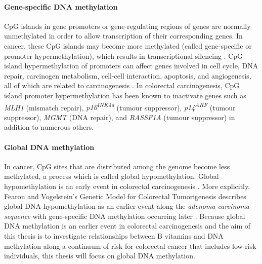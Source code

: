 \paragraph{Gene-specific DNA methylation} %
CpG islands in gene promoters or gene-regulating regions of genes are normally unmethylated in order to allow transcription of their corresponding genes. In cancer, these CpG islands may become more methylated (called gene-specific or promoter hypermethylation), which results in transcriptional silencing \cite{c185}. CpG island hypermethylation of promoters can affect genes involved in cell cycle, DNA repair, carcinogen metabolism, cell-cell interaction, apoptosis, and angiogenesis, all of which are related to carcinogenesis \cite{c182}. In colorectal carcinogenesis, CpG island promoter hypermethylation has been known to inactivate genes such as \textit{MLH1} (mismatch repair), \textit{p16\textsuperscript{INK4a}} (tumour suppressor), \textit{p14\textsuperscript{ARF}} (tumour suppressor), \textit{MGMT} (DNA repair), and \textit{RASSF1A} (tumour suppressor) \cite{c186,c187} in addition to numerous others. 
 
\paragraph{Global DNA methylation} %
In cancer, CpG sites that are distributed among the genome become less methylated, a process which is called global hypomethylation. Global hypomethylation is an early event in colorectal carcinogenesis \cite{c188,c189}. More explicitly, Fearon and Vogelstein's Genetic Model for Colorectal Tumorigenesis describes global DNA hypomethylation as an earlier event along the \textit{adenoma-carcinoma sequence} with gene-specific DNA methylation occurring later \cite{c14}. Because global DNA methylation is an earlier event in colorectal carcinogenesis and the aim of this thesis is to investigate relationships between B vitamins and DNA methylation along a continuum of risk for colorectal cancer that includes low-risk individuals, this thesis will focus on global DNA methylation. 
 
